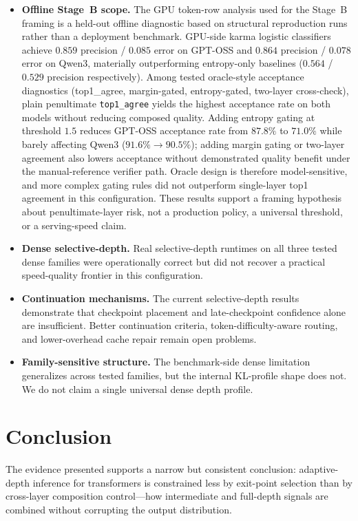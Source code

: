 \documentclass[11pt]{article}
\begin{document}
\begin{itemize}
\item \textbf{Offline Stage~B scope.} The GPU token-row analysis used for the Stage~B framing is a held-out offline diagnostic based on structural reproduction runs rather than a deployment benchmark. GPU-side karma logistic classifiers achieve $0.859$ precision / $0.085$ error on GPT-OSS and $0.864$ precision / $0.078$ error on Qwen3, materially outperforming entropy-only baselines ($0.564$ / $0.529$ precision respectively). Among tested oracle-style acceptance diagnostics (top1\_agree, margin-gated, entropy-gated, two-layer cross-check), plain penultimate \texttt{top1\_agree} yields the highest acceptance rate on both models without reducing composed quality. Adding entropy gating at threshold $1.5$ reduces GPT-OSS acceptance rate from $87.8\%$ to $71.0\%$ while barely affecting Qwen3 ($91.6\%\!\to\!90.5\%$); adding margin gating or two-layer agreement also lowers acceptance without demonstrated quality benefit under the manual-reference verifier path. Oracle design is therefore model-sensitive, and more complex gating rules did not outperform single-layer top1 agreement in this configuration. These results support a framing hypothesis about penultimate-layer risk, not a production policy, a universal threshold, or a serving-speed claim.

\item \textbf{Dense selective-depth.} Real selective-depth runtimes on all three tested dense families were operationally correct but did not recover a practical speed-quality frontier in this configuration.

\item \textbf{Continuation mechanisms.} The current selective-depth results demonstrate that checkpoint placement and late-checkpoint confidence alone are insufficient. Better continuation criteria, token-difficulty-aware routing, and lower-overhead cache repair remain open problems.

\item \textbf{Family-sensitive structure.} The benchmark-side dense limitation generalizes across tested families, but the internal KL-profile shape does not. We do not claim a single universal dense depth profile.
\end{itemize}

\section{Conclusion}

The evidence presented supports a narrow but consistent conclusion: adaptive-depth inference for transformers is constrained less by exit-point selection than by cross-layer composition control---how intermediate and full-depth signals are combined without corrupting the output distribution.
\end{document}
